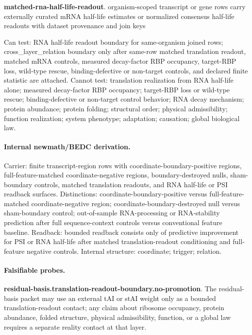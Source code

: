 \textbf{matched-rna-half-life-readout}. organism-scoped transcript or gene rows carry externally curated mRNA half-life estimates or normalized consensus half-life readouts with dataset provenance and join keys

Can test: RNA half-life readout boundary for same-organism joined rows; cross\_layer\_relation boundary only after same-row matched translation readout, matched mRNA controls, measured decay-factor RBP occupancy, target-RBP loss, wild-type rescue, binding-defective or non-target controls, and declared finite statistic are attached. Cannot test: translation realization from RNA half-life alone; measured decay-factor RBP occupancy; target-RBP loss or wild-type rescue; binding-defective or non-target control behavior; RNA decay mechanism; protein abundance; protein folding; structural order; physical admissibility; function realization; system phenotype; adaptation; causation; global biological law.

\paragraph{Internal newmath/BEDC derivation.} Carrier: finite transcript-region rows with coordinate-boundary-positive regions, full-feature-matched coordinate-negative regions, boundary-destroyed nulls, sham-boundary controls, matched translation readouts, and RNA half-life or PSI readback surfaces. Distinctions: coordinate-boundary-positive versus full-feature-matched coordinate-negative region; coordinate-boundary-destroyed null versus sham-boundary control; out-of-sample RNA-processing or RNA-stability prediction after full sequence-context controls versus conventional feature baseline. Readback: bounded readback consists only of predictive improvement for PSI or RNA half-life after matched translation-readout conditioning and full-feature negative controls. Internal structure: coordinate; trigger; relation.

\paragraph{Falsifiable probes.}
\textbf{residual-basis.translation-readout-boundary.no-promotion}. The residual-basis packet may use an external tAI or stAI weight only as a bounded translation-readout contact; any claim about ribosome occupancy, protein abundance, folded structure, physical admissibility, function, or a global law requires a separate reality contact at that layer.

